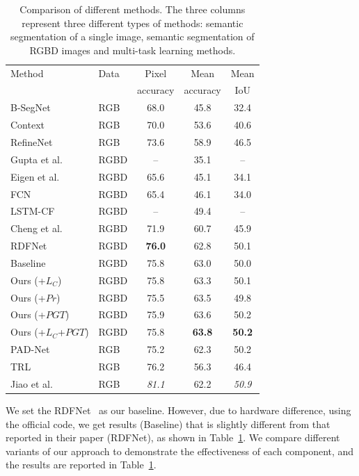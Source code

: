 \begin{table}[tb]
	\centering
	\caption{Comparison of different methods. The three columns represent three different types of methods: semantic segmentation of a single image, semantic segmentation of RGBD images and multi-task learning methods.}
	\begin{tabular*}{8.2cm}{llccc}
		\hline
		Method & Data & Pixel & Mean  & Mean\\
		       &     & accuracy & accuracy  & IoU \\
		\hline 
		B-SegNet \cite{Kendall2015} & RGB &68.0 & 45.8 & 32.4 \\
		Context \cite{Lin2016} & RGB & 70.0 & 53.6 & 40.6 \\
		RefineNet \cite{Lin2017} & RGB & 73.6 & 58.9 & 46.5\\
		\hline
		Gupta et al. \cite{Gupta2014} & RGBD & -- & 35.1 &--\\
		Eigen et al. \cite{Eigen2015} & RGBD & 65.6 & 45.1 & 34.1\\
		FCN \cite{Long2015} & RGBD & 65.4 & 46.1 & 34.0 \\
		LSTM-CF \cite{Li2016} & RGBD & --& 49.4 & -- \\
		Cheng et al.\cite{Cheng2017} & RGBD & 71.9 & 60.7 & 45.9 \\
		RDFNet \cite{Park2017} & RGBD & \bf{76.0} & 62.8 & 50.1\\	
		Baseline &RGBD & 75.8 & 63.0 & 50.0\\
		Ours (+$L_{C}$) & RGBD & 75.8 & 63.3 & 50.1\\	
		Ours (+$Pr$) & RGBD & 75.5 & 63.5 & 49.8\\
		Ours (+$PGT$) & RGBD & 75.9 & 63.6 & 50.2\\
		Ours (+$L_{C}$+$PGT$)& RGBD & 75.8 & \bf{63.8} & \bf{50.2}\\
		\hline
		PAD-Net \cite{Xu2018} & RGB &75.2 & 62.3 & 50.2\\
		TRL \cite{Zhang2018} & RGB &76.2 & 56.3 & 46.4\\
		Jiao et al.\cite{Jiao2018} & RGB & \emph{81.1} & 62.2 & \emph{50.9}\\
		\hline		 		
	\end{tabular*}
	\label{Tab:Results}
\end{table}

We set the RDFNet~\cite{Park2017} as our baseline. 
However, due to hardware difference, using the official code, we get results (Baseline) that is slightly different from that reported in their paper (RDFNet), as shown in Table~\ref{Tab:Results}. 
We compare different variants of our approach to demonstrate the effectiveness of each component, and the results are reported in Table~\ref{Tab:Results}. 

